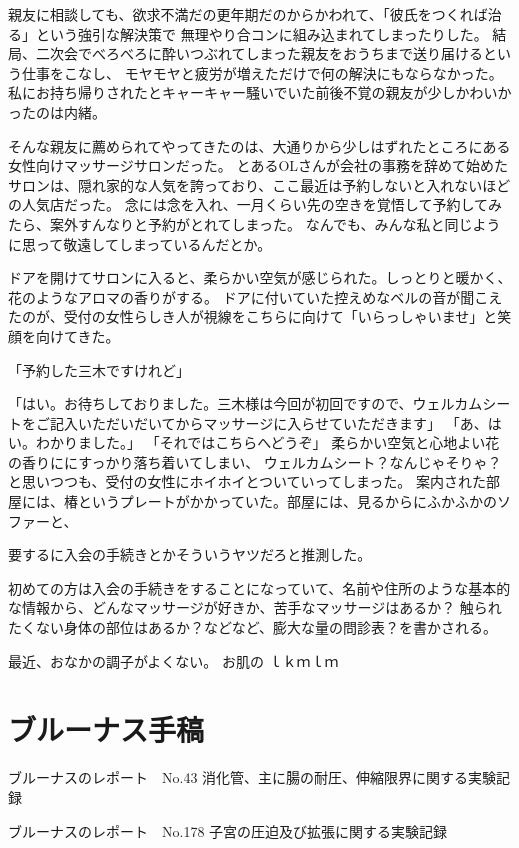 親友に相談しても、欲求不満だの更年期だのからかわれて、「彼氏をつくれば治る」という強引な解決策で
無理やり合コンに組み込まれてしまったりした。
結局、二次会でべろべろに酔いつぶれてしまった親友をおうちまで送り届けるという仕事をこなし、
モヤモヤと疲労が増えただけで何の解決にもならなかった。
私にお持ち帰りされたとキャーキャー騒いでいた前後不覚の親友が少しかわいかったのは内緒。



そんな親友に薦められてやってきたのは、大通りから少しはずれたところにある女性向けマッサージサロンだった。
とあるOLさんが会社の事務を辞めて始めたサロンは、隠れ家的な人気を誇っており、ここ最近は予約しないと入れないほどの人気店だった。
念には念を入れ、一月くらい先の空きを覚悟して予約してみたら、案外すんなりと予約がとれてしまった。
なんでも、みんな私と同じように思って敬遠してしまっているんだとか。

ドアを開けてサロンに入ると、柔らかい空気が感じられた。しっとりと暖かく、花のようなアロマの香りがする。
ドアに付いていた控えめなベルの音が聞こえたのが、受付の女性らしき人が視線をこちらに向けて「いらっしゃいませ」と笑顔を向けてきた。

「予約した三木ですけれど」

「はい。お待ちしておりました。三木様は今回が初回ですので、ウェルカムシートをご記入いただいだいてからマッサージに入らせていただきます」
「あ、はい。わかりました。」
「それではこちらへどうぞ」
柔らかい空気と心地よい花の香りににすっかり落ち着いてしまい、
ウェルカムシート？なんじゃそりゃ？と思いつつも、受付の女性にホイホイとついていってしまった。
案内された部屋には、椿というプレートがかかっていた。部屋には、見るからにふかふかのソファーと、




要するに入会の手続きとかそういうヤツだろと推測した。


初めての方は入会の手続きをすることになっていて、名前や住所のような基本的な情報から、どんなマッサージが好きか、苦手なマッサージはあるか？
触られたくない身体の部位はあるか？などなど、膨大な量の問診表？を書かされる。


最近、おなかの調子がよくない。
お肌の
ｌｋｍｌｍ


\chapter{ブルーナス手稿}


ブルーナスのレポート　No.43
消化管、主に腸の耐圧、伸縮限界に関する実験記録

ブルーナスのレポート　No.178
子宮の圧迫及び拡張に関する実験記録

